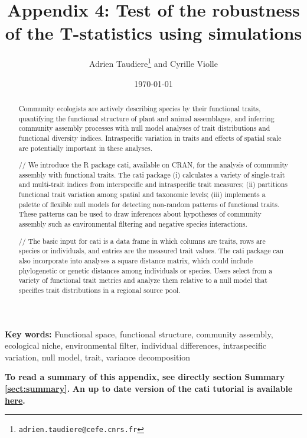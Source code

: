 \documentclass[12pt]{article}\usepackage[]{graphicx}\usepackage[]{color}
\title{Appendix 4: Test of the robustness of the T-statistics using simulations}
\author{Adrien Taudiere\thanks{\texttt{adrien.taudiere@cefe.cnrs.fr}} and Cyrille Violle}
\affil{{\footnotesize CEFE - Centre d'Ecologie Fonctionnelle et Evolutive, Montpellier: France}}
\date{\today}
\begin{document}




\maketitle

\begin{abstract}
  Community ecologists are actively describing species by their functional traits, quantifying the functional structure of plant and animal assemblages, and inferring community assembly processes with null model analyses of trait distributions and functional diversity indices. Intraspecific variation in traits and effects of spatial scale are potentially important in these analyses.
  
//
	We introduce the R package cati, available on CRAN, for the analysis of community assembly with functional traits. The cati package (i) calculates a variety of single-trait and multi-trait indices from interspecific and intraspecific trait measures; (ii) partitions functional trait variation among spatial and taxonomic levels; (iii) implements a palette of flexible null models for detecting non-random patterns of functional traits. These patterns can be used to draw inferences about hypotheses of community assembly such as environmental filtering and negative species interactions.
  
//
The basic input for cati is a data frame in which columns are traits, rows are species or individuals, and entries are the measured trait values. The cati package can also incorporate into analyses a square distance matrix, which could include phylogenetic or genetic distances among individuals or species. Users select from a variety of functional trait metrics and analyze them relative to a null model that specifies trait distributions in a regional source pool.

\end{abstract}


\textbf{Key words:}
Functional space, functional structure, community assembly, ecological niche, environmental filter,
individual differences, intraspecific variation, null model, trait, variance decomposition


\vfill
\begin{center}
\textbf{To read a summary of this appendix, see directly section Summary \ref{sect:summary}.}
\textbf{An up to date version of the cati tutorial is available \href{https://github.com/adrientaudiere/cati/blob/Package-cati/Documentation/vignette_Darwin_finches/vignette.pdf}{here}.}
\end{center}
\end{document}
